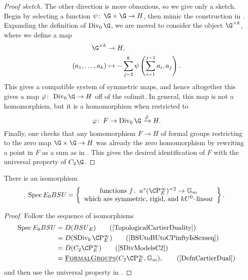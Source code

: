 \begin{proof}[Proof sketch]
The other direction is more obnoxious, so we give only a sketch.  Begin by selecting a function $\psi\co \G \times \G \to H$, then mimic the construction in .  Expanding the definition of $\Div_0 \G$, we are moved to consider the object $\G^{\times k}$, where we define a map
\begin{align*}
\G^{\times k} & \to H, \\
(a_1, \ldots, a_k) & \mapsto -\sum_{j=2}^k \psi\left(\sum_{i=1}^{j-1} a_i, a_j \right).
\end{align*}
This gives a compatible system of symmetric maps, and hence altogether this gives a map $\tilde\phi\co\Div_0 \G \to H$ off of the colimit.  In general, this map is not a homomorphism, but it is a homomorphism when restricted to \[\phi\co F \to \Div_0 \G \xrightarrow{\tilde\phi} H.\]  Finally, one checks that any homomorphism $F \to H$ of formal groups restricting to the zero map $\G \times \G \to H$ was already the zero homomorphism by rewriting a point in $F$ as a sum as in .  This gives the desired identification of $F$ with the universal property of $C_2 \G$.
\end{proof}

\begin{corollary}\label{CharacterizationOfBSUUpperE}
There is an isomorphism \[\Spec E_0 B\SU = \left\{\begin{array}{c} \text{functions $f\co u^* (\CP^\infty_E)^{\times 2} \to \Gm$} \\ \text{which are symmetric, rigid, and $kU^0$--linear} \end{array}\right\}.\]
\end{corollary}
\begin{proof}
Follow the sequence of isomorphisms
\begin{align*}
\Spec E_0 B\SU & = D(B\SU_E) \tag{\Cref{TopologicalCartierDuality}} \\
& = D(\SDiv_0 \CP^\infty_E) \tag{\Cref{BSUtoBUtoCPinftyIsSexseq}} \\
& = D(C_2 \CP^\infty_E) \tag{\Cref{SDivModelsC2}} \\
& = \InternalHom{FormalGroups}(C_2 \CP^\infty_E, \Gm), \tag{\Cref{DefnCartierDual}}
\end{align*}
and then use the universal property in .
\end{proof}

